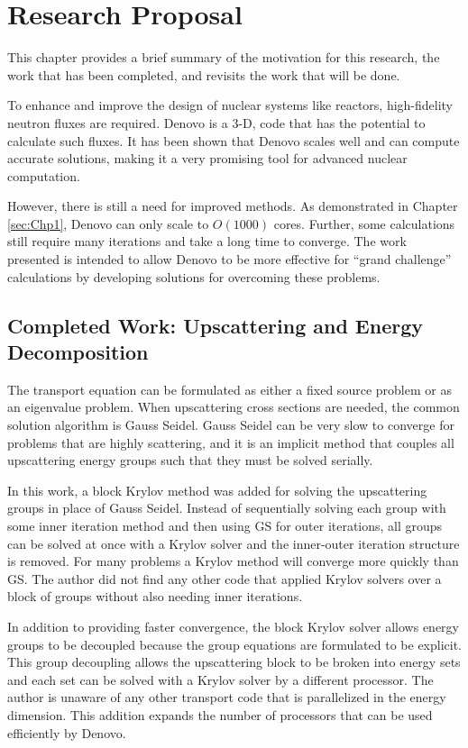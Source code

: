 
\chapter{Research Proposal}
\label{sec:Chp5}
This chapter provides a brief summary of the motivation for this research, the work that has been completed, and revisits the work that will be done. 

To enhance and improve the design of nuclear systems like reactors, high-fidelity neutron fluxes are required. Denovo is a 3-D, \Sn code that has the potential to calculate such fluxes. It has been shown that Denovo scales well and can compute accurate solutions, making it a very promising tool for advanced nuclear computation. 

However, there is still a need for improved methods. As demonstrated in Chapter \ref{sec:Chp1}, Denovo can only scale to $O(1000)$ cores. Further, some calculations still require many iterations and take a long time to converge. The work presented is intended to allow Denovo to be more effective for ``grand challenge'' calculations by developing solutions for overcoming these problems. 

\section{Completed Work: Upscattering and Energy Decomposition}
The transport equation can be formulated as either a fixed source problem or as an eigenvalue problem. When upscattering cross sections are needed, the common solution algorithm is Gauss Seidel. Gauss Seidel can be very slow to converge for problems that are highly scattering, and it is an implicit method that couples all upscattering energy groups such that they must be solved serially. 

In this work, a block Krylov method was added for solving the upscattering groups in place of Gauss Seidel. Instead of sequentially solving each group with some inner iteration method and then using GS for outer iterations, all groups can be solved at once with a Krylov solver and the inner-outer iteration structure is removed. For many problems a Krylov method will converge more quickly than GS. The author did not find any other code that applied Krylov solvers over a block of groups without also needing inner iterations. 

In addition to providing faster convergence, the block Krylov solver allows energy groups to be decoupled because the group equations are formulated to be explicit. This group decoupling allows the upscattering block to be broken into energy sets and each set can be solved with a Krylov solver by a different processor. The author is unaware of any other \Sn transport code that is parallelized in the energy dimension. This addition expands the number of processors that can be used efficiently by Denovo. 

